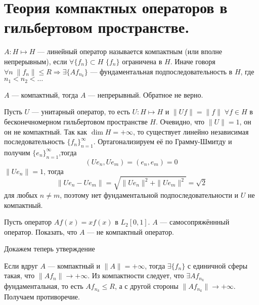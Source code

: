 \documentclass[14pt]{extarticle}
\begin{document}
\section*{Теория компактных операторов в гильбертовом пространстве.}
\begin{Opr}
    $A : H \mapsto H$ --- линейный оператор называется компактным (или вполне 
    непрерывным), если $\forall \{f_n\} \subset
    H$ $\{f_n\}$ ограничена в $H$.
    Иначе говоря $\forall n\; \|f_n\| \le R \Rightarrow \exists \{Af_{n_k}\}$ 
    --- фундаментальная подпоследовательность в $H$, 
    где $n_1 < n_2 < \dots$
\end{Opr}
\begin{Utv}
    $A$ --- компактный, тогда $A$ --- непрерывный.
    Обратное не верно. 
\end{Utv}
\begin{Prim}
    Пусть $U$ --- унитарный оператор, то есть $U : H \mapsto H$ и $\|Uf\| = \|
    f\|\; \forall f \in H$ в
    бесконечномерном гильбертовом пространстве $H$.
    Очевидно, что $\|U\| = 1$, он он не компактный.
    Так как $\dim H = +\infty$, то существует линейно независимая 
    последовательность $\{f_n\}_{n = 1}^{\infty}$.
    Ортагонализируем её по Грамму-Шмитду и получим $\{e_n\}_{n = 1}^{\infty}
    $,тогда
    $$
    (U e_n, U e_m) = (e_n, e_m) = 0
    $$
    $\|U e_n\| = 1$, тогда
    $$
    \|U e_n - U e_m\| = \sqrt{\|U e_n\|^2 + \|U e_m\|^2} = \sqrt{2}
    $$
    для любых $n \ne m$, поэтому нет фундаментальной подпоследовательности и 
    $U$ не компактный.
\end{Prim}
\begin{Upr}
    Пусть оператор $A f(x) = x f(x)$ в $L_2[0,1]$.
    $A$ --- самосопряжённный оператор.
    Показать, что $A$ --- не компактный оператор.
\end{Upr}

Докажем теперь утверждение
\begin{Proof}
    Если вдруг $A$ --- компактный и $\|A\| = +\infty$, тогда $\exists \{f_n\}$ 
    с единичной сферы такая, что $\|A f_n\| \to 
    +\infty$.
    Из компактности следует, что $\exists A f_{n_k}$ фундаментальная, то есть 
    $A f_{n_k} \le R$, а с другой стороны 
    $\|A f_{n_k}\| \to +\infty$.
    Получаем противоречие.
\end{Proof}
 
\end{document}
